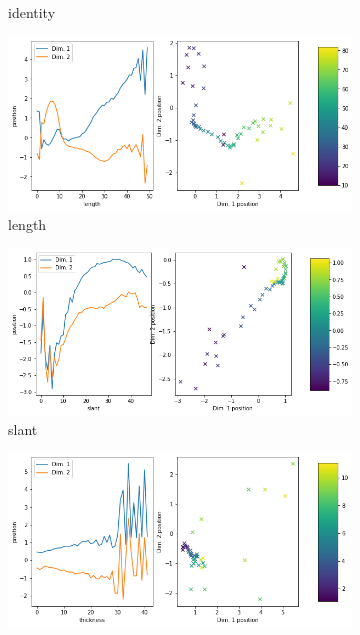 \documentclass[11pt,a4paper]{article}
\begin{document}
\begin{figure}[H]
\begin{subfigure}{.48\textwidth}
\caption{identity}
\end{subfigure}
\hfill
\begin{subfigure}{.48\textwidth}
\includegraphics[width=\textwidth]{images/latent_space_traversals/vae_gan_mnist_morpho_latent_space_values_length.png}
\caption{length}
\end{subfigure}
\begin{subfigure}{.48\textwidth}
\includegraphics[width=\textwidth]{images/latent_space_traversals/vae_gan_mnist_morpho_latent_space_values_slant.png}
\caption{slant}
\end{subfigure}
\hfill
\begin{subfigure}{.48\textwidth}
\includegraphics[width=\textwidth]{images/latent_space_traversals/vae_gan_mnist_morpho_latent_space_values_thickness.png}

\end{subfigure}
\end{figure}
\end{document}
